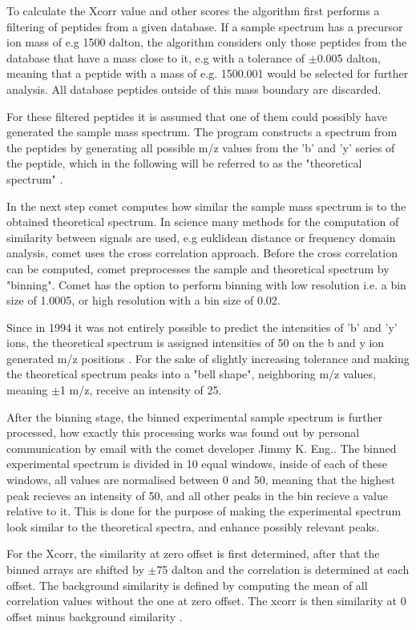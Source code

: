 \documentclass[11pt]{article}
\begin{document}
To calculate the Xcorr value and other scores the algorithm first performs a filtering of peptides from a given database. If a sample spectrum has a precursor ion mass of e.g 1500 dalton, the algorithm considers only those peptides from the database that have a mass close to it, e.g with a tolerance of  $\pm$0.005 dalton, meaning that a peptide with a mass of e.g. 1500.001 would be selected for further analysis. All database peptides outside of this mass boundary are discarded.

For these filtered peptides it is assumed that one of them could possibly have generated the sample mass spectrum. The program constructs a spectrum from the peptides by generating all possible m/z values from the 'b' and 'y' series of the peptide, which in the following will be referred to as the "theoretical spectrum" \cite{comet-first-paper}. 

In the next step comet computes how similar the sample mass spectrum is to the obtained theoretical spectrum. In science many methods for the computation of similarity between signals are used, e.g euklidean distance or frequency domain analysis, comet uses the cross correlation approach. Before the cross correlation can be computed, comet preprocesses the sample and theoretical spectrum by "binning". Comet has the option to perform binning with low resolution i.e. a bin size of 1.0005, or high resolution with a bin size of 0.02. 

Since in 1994 it was not entirely possible to predict the intensities of 'b' and 'y' ions, the theoretical spectrum is assigned intensities of 50 on the b and y ion generated m/z positions \cite{deeper-look-into-comet}. For the sake of slightly increasing tolerance and making the theoretical spectrum peaks into a "bell shape", neighboring m/z values, meaning $\pm$1 m/z, receive an intensity of 25. 

After the binning stage, the binned experimental sample spectrum is further processed, how exactly this processing works was found out by personal communication by email with the comet developer Jimmy K. Eng.. The binned experimental spectrum is divided in 10 equal windows, inside of each of these windows, all values are normalised between 0 and 50, meaning that the highest peak recieves an intensity of 50, and all other peaks in the bin recieve a value relative to it. This is done for the purpose of making the experimental spectrum look similar to the theoretical spectra, and enhance possibly relevant peaks.

For the Xcorr, the similarity at zero offset is first determined, after that the binned arrays are shifted by $\pm$75 dalton and the correlation is determined at each offset. The background similarity is defined by computing the mean of all correlation values without the one at zero offset. The xcorr is then similarity at 0 offset minus background similarity \cite{xcorr-function}.
\end{document}
